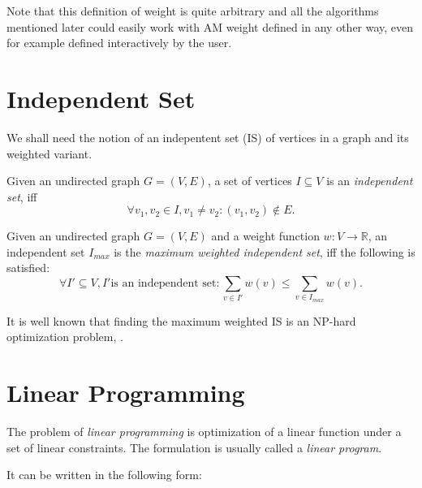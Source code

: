 Note that this definition of weight is quite arbitrary and all the algorithms mentioned later could easily work with AM weight defined in any other way, even for example defined interactively by the user.

\section{Independent Set}
\label{section-definitions-is}


We shall need the notion of an indepentent set (IS) of vertices in a graph and its weighted variant.

\begin{define}
Given an undirected graph $G = (V, E)$, a set of vertices $I \subseteq V$ is an \textit{independent set}, iff
\[\forall v_1, v_2 \in I, v_1 \neq v_2: (v_1, v_2) \notin E.\]
\end{define}

\begin{define}
Given an undirected graph $G = (V, E)$ and a weight function $w: V \rightarrow \mathbb{R}$, an independent set $I_{max}$ is the \textit{maximum weighted independent set}, iff the following is satisfied:
\[\forall I' \subseteq V, I' \text{is an independent set}: \sum_{v \in I'} w(v) \leqslant \sum_{v \in I_{max}} w(v).\]
\end{define}

It is well known that finding the maximum weighted IS is an NP-hard optimization problem, \cite{JM1986425}.

\section{Linear Programming}

The problem of \textit{linear programming} is optimization of a linear function under a set of linear constraints. The formulation is usually called a \textit{linear program}. 

It can be written in the following form:

